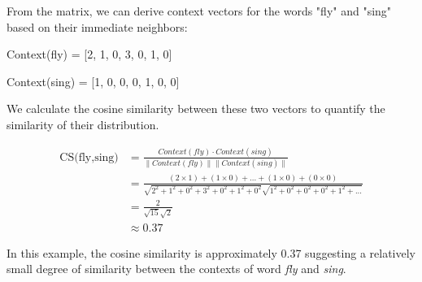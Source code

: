 From the matrix, we can derive context vectors for the words "fly" and "sing" based on their immediate neighbors:

Context(fly) = [2, 1, 0, 3, 0, 1, 0]

Context(sing) = [1, 0, 0, 0, 1, 0, 0] 

We calculate the cosine similarity between these two vectors to quantify the similarity of their distribution. 

\begin{equation}
\nonumber
  \begin{aligned}
    \text{CS(fly,sing)} & = \frac{Context(fly) \cdot Context(sing)} {\|Context(fly)\| \|Context(sing)\|} \\
                     & = \frac{(2 \times 1) + (1 \times 0) + ... %
                     + (1 \times 0) + (0 \times 0) }{\sqrt{2^2 + 1^2 + 0^2 + 3^2 + 0^2 
                     + 1^2 + 0^2} \sqrt{1^2 + 0^2 + 0^2 + 0^2 + 1^2 + ...}} \\
                     & =  \frac{2}{\sqrt{15}\sqrt{2}} \\
                     & \approx 0.37 
  \end{aligned}
\end{equation}


In this example, the cosine similarity is approximately 0.37 suggesting a relatively small degree of similarity between the contexts of word \textit{fly} and \textit{sing}. 